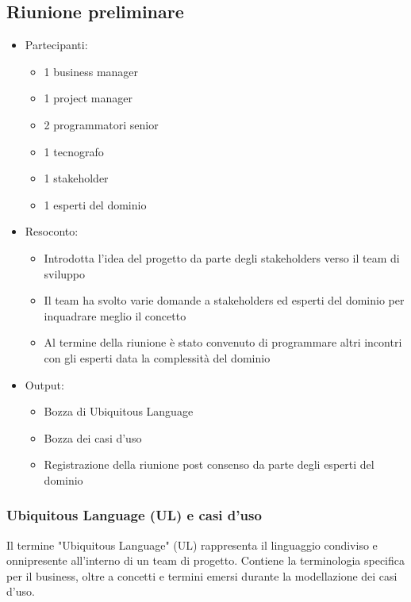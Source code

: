 \subsection{Riunione preliminare}
\begin{itemize}
    \item Partecipanti:
          \begin{itemize}
              \item 1 business manager
              \item 1 project manager
              \item 2 programmatori senior
              \item 1 tecnografo
              \item 1 stakeholder
              \item 1 esperti del dominio
          \end{itemize}
    \item Resoconto:
          \begin{itemize}
              \item Introdotta l'idea del progetto da parte degli stakeholders verso il team di sviluppo
              \item Il team ha svolto varie domande a stakeholders ed esperti del dominio per inquadrare meglio il concetto
              \item Al termine della riunione è stato convenuto di programmare altri incontri con gli esperti data la complessità del dominio
          \end{itemize}
    \item Output:
          \begin{itemize}
              \item Bozza di Ubiquitous Language
              \item Bozza dei casi d'uso
              \item Registrazione della riunione post consenso da parte degli esperti del dominio
          \end{itemize}
\end{itemize}

\subsubsection{Ubiquitous Language (UL) e casi d'uso}
Il termine "Ubiquitous Language" (UL) rappresenta il linguaggio condiviso e onnipresente all'interno di un team
di progetto. Contiene la terminologia specifica per il business, oltre a concetti e termini emersi durante la
modellazione dei casi d'uso.

